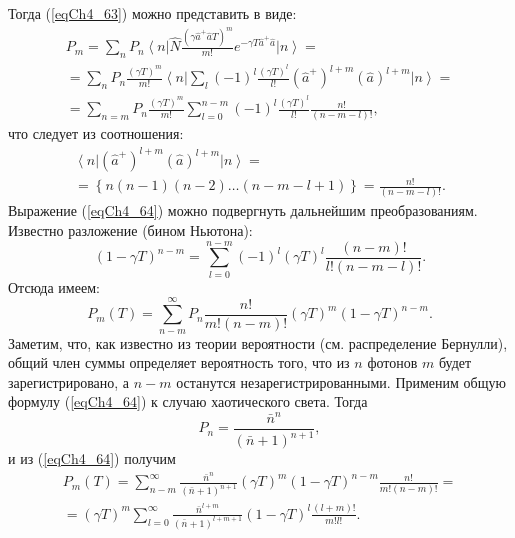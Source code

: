 Тогда (\ref{eqCh4_63}) можно представить в виде:
\begin{eqnarray}
P_m = \sum_n P_n 
\left<n\right|
\hat{N}
\frac{\left(\gamma \hat{a}^{+} \hat{a} T\right)^m}{m!}
e^{- \gamma T \hat{a}^{+} \hat{a}}
\left|n\right> = 
\nonumber \\
=
\sum_n P_n 
\frac{\left(\gamma T\right)^m}{m!}
\left<n\right|
\sum_l\left(-1\right)^l
\frac{\left(\gamma T\right)^l}{l!}
\left(\hat{a}^{+}\right)^{l + m}
\left(\hat{a}\right)^{l + m}
\left|n\right> = 
\nonumber \\
=
\sum_{n = m}
P_n 
\frac{\left(\gamma T\right)^m}{m!}
\sum_{l = 0}^{n - m}\left(-1\right)^l
\frac{\left(\gamma T\right)^l}{l!}
\frac{n!}{\left(n - m - l\right)!},
\label{eqCh4_64}
\end{eqnarray}
что следует из соотношения:
\begin{eqnarray}
\left<n\right|
\left(\hat{a}^{+}\right)^{l + m}
\left(\hat{a}\right)^{l + m}
\left|n\right> = 
\nonumber \\
= \left\{
n \left(n - 1\right)\left(n - 2\right) \dots
\left(n - m - l + 1\right)
\right\} = 
\frac{n!}{\left(n - m - l\right)!}.
\nonumber
\end{eqnarray}
Выражение (\ref{eqCh4_64}) можно подвергнуть дальнейшим
преобразованиям. Известно разложение (бином Ньютона): 
\[
\left(1 - \gamma T\right)^{n - m} = 
\sum_{l = 0}^{n -m}
\left(-1\right)^l
\left(\gamma T\right)^l
\frac{\left(n - m\right)!}{l!\left(n - m - l\right)!}.
\]
Отсюда имеем:
\begin{equation}
P_m\left(T\right) = 
\sum_{n - m}^{\infty}
P_n 
\frac{n!}{m!\left(n - m\right)!}
\left(\gamma T\right)^m
\left(1 - \gamma T\right)^{n - m}.
\label{eqCh4_64a}
\end{equation}
Заметим, что, как известно из теории вероятности (см. распределение
Бернулли), общий член суммы определяет вероятность того, что из $n$
фотонов $m$ будет зарегистрировано, а  $n - m$  останутся
незарегистрированными. Применим общую формулу (\ref{eqCh4_64}) к случаю
хаотического света. Тогда  
\[
P_n = \frac{\bar{n}^n}{\left(\bar{n} + 1\right)^{n + 1}},
\]
и из (\ref{eqCh4_64}) получим 
\begin{eqnarray}
P_m\left(T\right) = 
\sum_{n - m}^{\infty}
\frac{\bar{n}^n}{\left(\bar{n} + 1\right)^{n + 1}}
\left(\gamma T\right)^m
\left(1 - \gamma T\right)^{n - m} 
\frac{n!}{m!\left(n - m\right)!}
=
\nonumber \\
=
\left(\gamma T\right)^m
\sum_{l = 0}^{\infty}
\frac{\bar{n}^{l + m}}{\left(\bar{n} + 1\right)^{l + m + 1}}
\left(1 - \gamma T\right)^{l}
\frac{\left(l + m\right)!}{m! l!}. 
\label{eqCh4_65}
\end{eqnarray}

